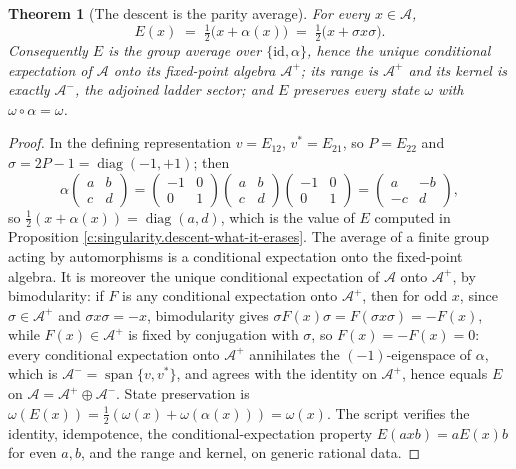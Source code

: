 \documentclass[11pt]{article}
\newtheorem{theorem}{Theorem}[section]
\theoremstyle{definition}
\theoremstyle{plain}
\providecommand{\Aa}{}\renewcommand{\Aa}{\mathcal{A}}
\providecommand{\Aev}{}\renewcommand{\Aev}{\mathcal{A}^{+}}
\providecommand{\Aod}{}\renewcommand{\Aod}{\mathcal{A}^{-}}
\providecommand{\id}{}\renewcommand{\id}{\mathrm{id}}
\begin{document}
\begin{theorem}[The descent is the parity average]\label{c:singularity.descent-parity-average}
For every $x \in \Aa$,
\[
E(x) \;=\; \tfrac12\bigl(x + \alpha(x)\bigr) \;=\; \tfrac12\bigl(x + \sigma x \sigma\bigr) .
\]
Consequently $E$ is the group average over $\{\id, \alpha\}$, hence the unique conditional expectation of $\Aa$ onto its fixed-point algebra $\Aev$; its range is $\Aev$ and its kernel is exactly $\Aod$, the adjoined ladder sector; and $E$ preserves every state $\omega$ with $\omega \circ \alpha = \omega$.
\end{theorem}
\begin{proof}
In the defining representation $v = E_{12}$, $v^{*} = E_{21}$, so $P = E_{22}$ and $\sigma = 2P - 1 = \operatorname{diag}(-1, +1)$; then
\[
\alpha\begin{pmatrix} a & b \\ c & d \end{pmatrix}
= \begin{pmatrix} -1 & 0 \\ 0 & 1\end{pmatrix}\begin{pmatrix} a & b \\ c & d \end{pmatrix}\begin{pmatrix} -1 & 0 \\ 0 & 1\end{pmatrix}
= \begin{pmatrix} a & -b \\ -c & d \end{pmatrix},
\]
so $\tfrac12(x + \alpha(x)) = \operatorname{diag}(a,d)$, which is the value of $E$ computed in Proposition \ref{c:singularity.descent-what-it-erases}. The average of a finite group acting by automorphisms is a conditional expectation onto the fixed-point algebra. It is moreover the unique conditional expectation of $\Aa$ onto $\Aev$, by bimodularity: if $F$ is any conditional expectation onto $\Aev$, then for odd $x$, since $\sigma \in \Aev$ and $\sigma x \sigma = -x$, bimodularity gives $\sigma F(x) \sigma = F(\sigma x \sigma) = -F(x)$, while $F(x) \in \Aev$ is fixed by conjugation with $\sigma$, so $F(x) = -F(x) = 0$: every conditional expectation onto $\Aev$ annihilates the $(-1)$-eigenspace of $\alpha$, which is $\Aod = \operatorname{span}\{v, v^{*}\}$, and agrees with the identity on $\Aev$, hence equals $E$ on $\Aa = \Aev \oplus \Aod$. State preservation is $\omega(E(x)) = \tfrac12(\omega(x) + \omega(\alpha(x))) = \omega(x)$. The script verifies the identity, idempotence, the conditional-expectation property $E(axb) = aE(x)b$ for even $a, b$, and the range and kernel, on generic rational data.

\end{proof}
\end{document}
